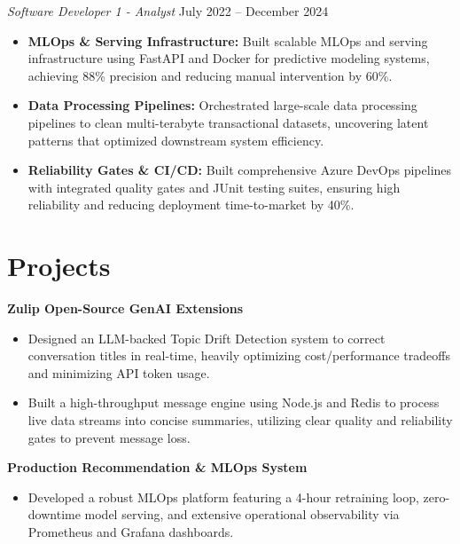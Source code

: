 \documentclass[11pt,a4paper]{article}
\begin{document}
\vspace{3pt}
\noindent
\textit{Software Developer 1 - Analyst} \hfill July 2022 -- December 2024
\begin{itemize}[leftmargin=*,noitemsep,topsep=0pt]
    \item \textbf{MLOps \& Serving Infrastructure:} Built scalable MLOps and serving infrastructure using FastAPI and Docker for predictive modeling systems, achieving 88\% precision and reducing manual intervention by 60\%.
    \item \textbf{Data Processing Pipelines:} Orchestrated large-scale data processing pipelines to clean multi-terabyte transactional datasets, uncovering latent patterns that optimized downstream system efficiency.
    \item \textbf{Reliability Gates \& CI/CD:} Built comprehensive Azure DevOps pipelines with integrated quality gates and JUnit testing suites, ensuring high reliability and reducing deployment time-to-market by 40\%.
\end{itemize}

\vspace{-5pt}
\section{Projects}
\noindent
\textbf{Zulip Open-Source GenAI Extensions}
\begin{itemize}[leftmargin=*,noitemsep,topsep=0pt]
    \item Designed an LLM-backed Topic Drift Detection system to correct conversation titles in real-time, heavily optimizing cost/performance tradeoffs and minimizing API token usage.
    \item Built a high-throughput message engine using Node.js and Redis to process live data streams into concise summaries, utilizing clear quality and reliability gates to prevent message loss.
\end{itemize}

\vspace{3pt}
\noindent
\textbf{Production Recommendation \& MLOps System}
\begin{itemize}[leftmargin=*,noitemsep,topsep=0pt]
    \item Developed a robust MLOps platform featuring a 4-hour retraining loop, zero-downtime model serving, and extensive operational observability via Prometheus and Grafana dashboards.
\end{itemize}
\end{document}

